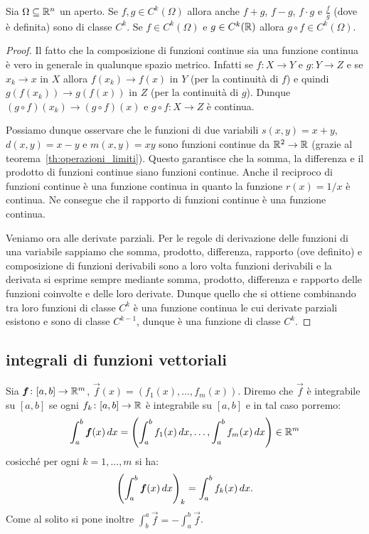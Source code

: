 \begin{theorem}
Sia $\Omega \subseteq {\mathbb R}^n$ un aperto.
Se $f,g\in C^k(\Omega)$ allora anche $f+g$, $f-g$, $f\cdot g$ e $\frac{f}{g}$
(dove è definita) sono di classe $C^k$. Se $f\in C^k(\Omega)$ e $g\in C^k({\mathbb R})$
allora $g\circ f \in C^k(\Omega)$.
\end{theorem}
%
\begin{proof}
Il fatto che la composizione di funzioni continue sia una funzione continua
è vero in generale in qualunque spazio metrico.
Infatti se $f\colon X\to Y$ e $g\colon Y \to Z$ e se $x_k\to x$ in $X$
allora $f(x_k) \to f(x)$ in $Y$ (per la continuità di $f$)
e quindi $g(f(x_k)) \to g(f(x))$ in $Z$ (per la continuità di $g$).
Dunque $(g \circ f)(x_k) \to (g\circ f)(x)$ e $g\circ f\colon X\to Z$ è continua.

Possiamo dunque osservare che le funzioni di due variabili $s(x,y) = x+y$,
$d(x,y)=x-y$ e
$m(x,y)=xy$ sono funzioni continue da ${\mathbb R}^2\to {\mathbb R}$ 
(grazie al teorema~\ref{th:operazioni_limiti}). 
Questo garantisce
che la somma, la differenza e il prodotto di funzioni continue siano funzioni continue.
Anche il reciproco di funzioni continue è una funzione continua
in quanto la funzione $r(x)=1/x$ è continua.
Ne consegue che il rapporto di funzioni continue è una
funzione continua.

Veniamo ora alle derivate parziali.
Per le regole di derivazione delle funzioni di una variabile sappiamo che
somma, prodotto, differenza, rapporto (ove definito) e composizione
di funzioni derivabili sono
a loro volta funzioni derivabili e la derivata si esprime sempre mediante
somma, prodotto, differenza e rapporto delle funzioni coinvolte e delle loro
derivate. Dunque quello che si ottiene combinando tra loro funzioni
di classe $C^k$ è una funzione continua le cui derivate parziali esistono e
sono di classe $C^{k-1}$, dunque è una funzione di classe $C^k$.
\end{proof}

\subsection{integrali di funzioni vettoriali}

\begin{definition}
Sia $\boldsymbol f\colon [a,b]\to {\mathbb R}^m$, $\vec f(x) = (f_1(x), \dots, f_m(x))$.
Diremo che $\vec f$ è integrabile su $[a,b]$ se ogni
$f_k\colon[a,b]\to {\mathbb R}$ è integrabile su $[a,b]$ e in tal caso porremo:
\[
  \int_a^b \boldsymbol f(x)\, dx
  = {\left( \int_a^b f_1(x)\, dx, \dots, \int_a^b f_m(x)\, dx \right)}
  \in {\mathbb R}^m
\]
cosicché per ogni $k=1,\dots, m$ si ha:
\[
  {\left( \int_a^b \boldsymbol f(x)\, dx \right)}_k = \int_a^b f_k(x)\, dx.
\]
Come al solito si pone inoltre $\int_b^a \vec f = - \int_a^b \vec f$.
\end{definition}

